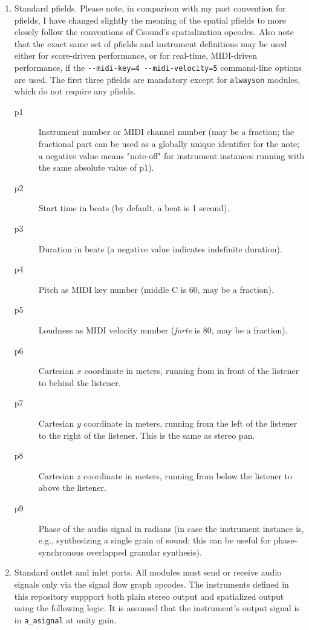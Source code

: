 \documentclass[12pt,letterpaper,onecolumn]{scrartcl}
\begin{document}
\begin{enumerate}
	\item Standard pfields. Please note, in comparison with my past convention 
	for pfields, I have changed slightly the meaning of the spatial pfields to 
more closely follow the conventions of Csound's spatialization opcodes. Also 
note that the exact same set of pfields and instrument definitions may be used 
either for score-driven performance, or for real-time, MIDI-driven performance, 
if the \texttt{-\--midi-key=4 -\--midi-velocity=5} command-line options are 
used. The first three pfields are mandatory except for \texttt{alwayson} 
modules, which do not require any pfields.
        \begin{description}
			\item[p1]	Instrument number or MIDI channel number (may be a 
			fraction; the fractional part can be used as a globally unique 
identifier for the note; a negative value means "note-off" for instrument 
instances running with the same absolute value of p1).
			\item[p2] 	Start time in beats (by default, a beat is 1 second).
			\item[p3] 	Duration in beats (a negative value indicates 
			indefinite duration).
			\item[p4] 	Pitch as MIDI key number (middle C is 60, may be a 
			fraction).
			\item[p5] 	Loudness as MIDI velocity number (\emph{forte} is 80, 
			may be a fraction).
			\item[p6] 	Cartesian $x$ coordinate in meters, running from in 
			front of the listener to behind the listener.
			\item[p7] 	Cartesian $y$ coordinate in meters, running from the 
			left of the listener to the right of the listener. This is the 
same as stereo pan.
			\item[p8] 	Cartesian $z$ coordinate in meters, running from below 
			the listener to above the listener.
			\item[p9] 	Phase of the audio signal in radians (in case the 
			instrument instance is, e.g., synthesizing a single grain of sound; 
this can be useful for phase-synchronous overlapped granular synthesis).
        \end{description}
	\item Standard outlet and inlet ports. All modules must send or receive 
	audio signals only via the signal flow graph opcodes. The instruments 
	defined in this repository suppport both plain stereo output and 
	spatialized output using the following logic. It is assumed that the 
	instrument's output signal is in \texttt{a\_asignal} at unity gain.
	

\end{enumerate}
\end{document}
